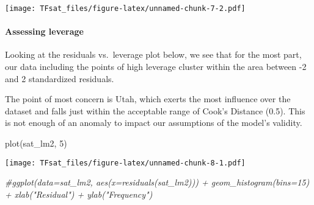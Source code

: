 \documentclass[
]{article}
\newenvironment{Shaded}{\begin{snugshade}}{\end{snugshade}}
\newcommand{\CommentTok}[1]{\textcolor[rgb]{0.56,0.35,0.01}{\textit{#1}}}
\newcommand{\DecValTok}[1]{\textcolor[rgb]{0.00,0.00,0.81}{#1}}
\newcommand{\FunctionTok}[1]{\textcolor[rgb]{0.00,0.00,0.00}{#1}}
\newcommand{\NormalTok}[1]{#1}
\begin{document}
\texttt{[image: TFsat\_files/figure-latex/unnamed-chunk-7-2.pdf]}

\hypertarget{assessing-leverage}{%
\paragraph{Assessing leverage}\label{assessing-leverage}}

Looking at the residuals vs.~leverage plot below, we see that for the
most part, our data including the points of high leverage cluster within
the area between -2 and 2 standardized residuals.

The point of most concern is Utah, which exerts the most influence over
the dataset and falls just within the acceptable range of Cook's
Distance (0.5). This is not enough of an anomaly to impact our
assumptions of the model's validity.

\begin{Shaded}
\begin{Highlighting}[]
\FunctionTok{plot}\NormalTok{(sat\_lm2, }\DecValTok{5}\NormalTok{)}
\end{Highlighting}
\end{Shaded}

\texttt{[image: TFsat\_files/figure-latex/unnamed-chunk-8-1.pdf]}

\begin{Shaded}
\begin{Highlighting}[]
\CommentTok{\#ggplot(data=sat\_lm2, aes(x=residuals(sat\_lm2))) + geom\_histogram(bins=15) + xlab("Residual") + ylab("Frequency")}
\end{Highlighting}
\end{Shaded}
\end{document}
